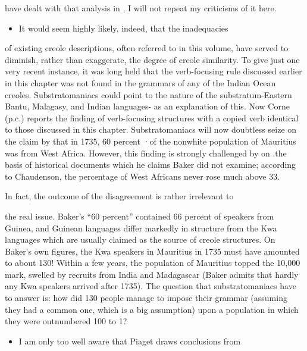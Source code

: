 \begin{itemize}
\begin{itemize}
\begin{itemize}
\begin{itemize}

have dealt with that analysis in \citet{Bickerton1980}, I will not repeat my criticisms of it here.

\begin{itemize}
\item It would seem highly likely, indeed, that the inadequacies
\end{itemize}

of existing creole descriptions, often referred to in this volume, have served to diminish, rather than exaggerate, the degree of creole simi\-larity. To give just one very recent instance, it was long held that the verb-focusing rule discussed earlier in this chapter was not found in the grammars of any of the Indian Ocean creoles. Substratomaniacs could point to the nature of the substratum-Eastern Bantu, Malagasy, and Indian languages- as an explanation of this. Now Corne (p.c.) reports the finding of verb-focusing structures with a copied verb identical to those discussed in this chapter. Substratomaniacs will now doubtless seize on the claim by \citet{Baker1976} that in 1735, 60 percent ·of the nonwhite population of Mauritius was from West Africa. However, this finding is strongly challenged by \citet{Chaudenson1979} on .the basis of historical documents which he claims Baker did not examine; according to Chaudenson, the percentage of West Africans never rose much above 33.

In fact, the outcome of the disagreement is rather irrelevant to

the real issue. Baker's ``60 percent'' contained 66 percent of speakers from Guinea, and Guinean languages differ markedly in structure from the Kwa languages which are usually claimed as the source of creole structures. On Baker's own figures, the Kwa speakers in Mauritius in 1735 must have amounted to about 130! Within a few years, the population of Mauritius topped the 10,000 mark, swelled by recruits from India and Madagascar (Baker admits that hardly any Kwa speakers arrived after 1735). The question that substratomaniacs have to answer is: how did 130 people manage to impose their grammar (assuming they had a common one, which is a big assumption) upon a population in which they were outnumbered 100 to 1?

\begin{itemize}
\item I am only too well aware that Piaget draws conclusions from
\end{itemize}


\end{itemize}
\end{itemize}
\end{itemize}
\end{itemize}
